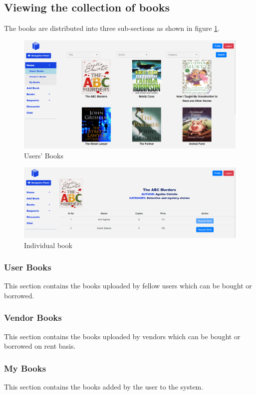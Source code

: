 \documentclass[conference]{IEEEtran}
\begin{document}
\subsection{Viewing the collection of books}
The books are distributed into three sub-sections as shown in figure \ref{fig:usersbooks}.
\begin{figure}[h]
     \centering
     \includegraphics[scale=0.20,margin=2,frame]{usersbooks.PNG}
     \caption{Users' Books}
     \label{fig:usersbooks}
 \end{figure}
 \begin{figure}[h]
     \centering
     \includegraphics[scale=0.20,margin=2,frame]{individualbook.PNG}
     \caption{Individual book}
     \label{fig:individualbook}
 \end{figure}
\subsubsection{User Books}
This section contains the books uploaded by fellow users which can be bought or borrowed. 
\subsubsection{Vendor Books}
This section contains the books uploaded by vendors which can be bought or borrowed on rent basis.
\subsubsection {My Books}
This section contains the books added by the user to the system.
\end{document}
